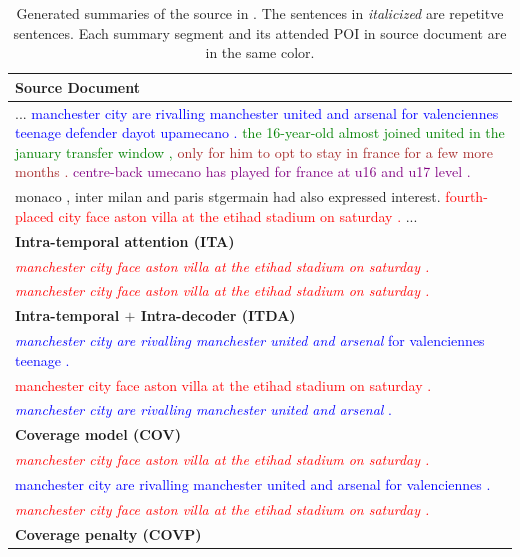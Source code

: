 \begin{table}[th!]
\begin{center}
\caption{\label{tab:strong_methods} Generated summaries of the source in . The sentences in \textit{italicized} are repetitve sentences.
Each summary segment and its attended POI in source document are in the same color.}
\begin{tabular}{|p{13cm}|}
\hline \bf Source Document \\
\hline ... \textcolor{blue}{manchester city are rivalling manchester united and arsenal for valenciennes teenage defender dayot upamecano .} \textcolor{green}{the 16-year-old almost joined united in the january transfer window ,} \textcolor{brown}{only for him to opt to stay in france for a few more months .}  \textcolor{purple}{centre-back umecano has played for france at u16 and u17 level .} \\
monaco , inter milan and paris stgermain had also expressed interest. \textcolor{red}{fourth-placed city face aston villa at the etihad stadium on saturday .} ...\\
\hline \bf Intra-temporal attention (ITA) \\
\hline \textcolor{red}{\textit{manchester city face aston villa at the etihad stadium on saturday .}} \\
          \textcolor{red}{\textit{manchester city face aston villa at the etihad stadium on saturday .}} \\
\hline \bf Intra-temporal $+$ Intra-decoder (ITDA) \\
\hline \textcolor{blue}{\textit{manchester city are rivalling manchester united and arsenal }for valenciennes teenage .}\\
        \textcolor{red}{manchester city face aston villa at the etihad stadium on saturday .} \\
	   \textcolor{blue}{\textit{manchester city are rivalling manchester united and arsenal }. }\\
\hline \bf Coverage model (COV) \\
\hline \textcolor{red}{\textit{manchester city face aston villa at the etihad stadium on saturday .}} \\
       \textcolor{blue}{manchester city are rivalling manchester united and arsenal for valenciennes .}\\
      \textcolor{red}{\textit{manchester city face aston villa at the etihad stadium on saturday .}} \\
\hline \bf Coverage penalty (COVP)\\

\end{tabular}
\end{center}
\end{table}
